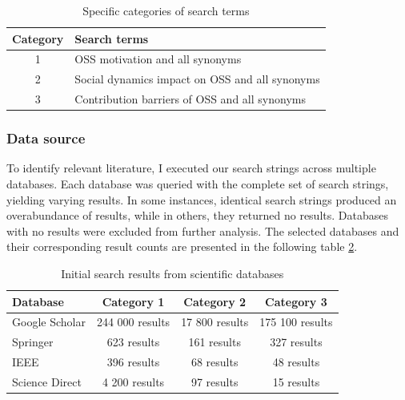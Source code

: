\begin{table}[ht]
    \centering
    \begin{tabular}{ | c | l | }
        \hline
        Category & Search terms                                   \\ \hline
        1        & OSS motivation and all synonyms                \\ \hline
        2        & Social dynamics impact on OSS and all synonyms \\  \hline
        3        & Contribution barriers of OSS and all synonyms  \\  \hline
    \end{tabular}
    \caption{Specific categories of search terms}
    \label{tab:categoriesSearchTerms}
\end{table}



\subsubsection{Data source}

To identify relevant literature, I executed our search strings across multiple databases. Each database was queried with the complete set of search strings, yielding varying results. In some instances, identical search strings produced an overabundance of results, while in others, they returned no results. Databases with no results were excluded from further analysis. The selected databases and their corresponding result counts are presented in the following table \ref{tab:initialSearch}.


\begin{table}[ht]
    \centering
    \begin{tabular}{ | l | c | c | c |}
        \hline
        Database       & Category 1      & Category 2     & Category 3      \\ \hline
        Google Scholar & 244 000 results & 17 800 results & 175 100 results \\ \hline
        Springer       & 623 results     & 161 results    & 327 results     \\ \hline
        IEEE           & 396 results     & 68 results     & 48 results      \\ \hline
        Science Direct & 4 200 results   & 97 results     & 15 results      \\ \hline
    \end{tabular}
    \caption{Initial search results from scientific databases}
    \label{tab:initialSearch}
\end{table}




